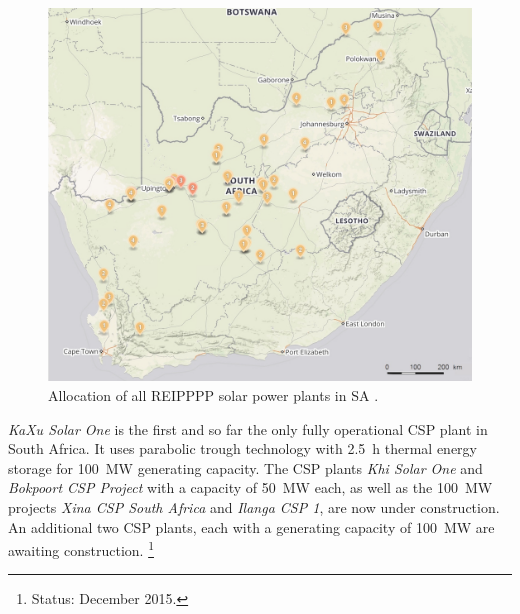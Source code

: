 \begin{figure}[h!]
\centering
\includegraphics[width=1\linewidth]{FIG/Solar-map}
\caption[Allocation of all REIPPPP solar power plants in SA.]{Allocation of all REIPPPP solar power plants in SA \cite{Forder2015}.}\label{Solar-map}
\end{figure}


\emph{KaXu Solar One} is the first and so far the only fully operational \ac{CSP} plant in South Africa. It uses parabolic trough technology with \SI{2.5}{\hour} thermal energy storage for \SI{100}{\mega\watt} generating capacity. The \ac{CSP} plants \emph{Khi Solar One} and \emph{Bokpoort CSP Project} with a capacity of \SI{50}{\mega\watt} each, as well as the \SI{100}{\mega\watt} projects \emph{Xina CSP South Africa} and \emph{Ilanga CSP 1}, are now under construction. An additional two \ac{CSP} plants, each with a generating capacity of \SI{100}{\mega\watt} are awaiting construction. \cite{Forder2015}\footnote{Status: December 2015.}

